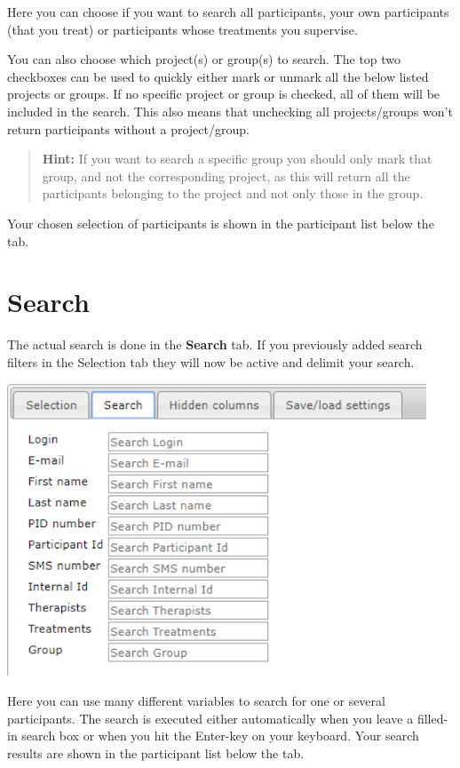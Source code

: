 \documentclass[
]{book}
\begin{document}
Here you can choose if you want to search all participants, your own participants (that you treat) or participants whose treatments you supervise.

You can also choose which project(s) or group(s) to search. The top two checkboxes can be used to quickly either mark or unmark all the below listed projects or groups. If no specific project or group is checked, all of them will be included in the search. This also means that unchecking all projects/groups won't return participants without a project/group.

\begin{quote}
\textbf{Hint:} If you want to search a specific group you should only mark that group, and not the corresponding project, as this will return all the participants belonging to the project and not only those in the group.
\end{quote}

Your chosen selection of participants is shown in the participant list below the tab.

\section{Search}\label{search}

The actual search is done in the \textbf{Search} tab. If you previously added search filters in the Selection tab they will now be active and delimit your search.

\includegraphics{images/search.png}

Here you can use many different variables to search for one or several participants. The search is executed either automatically when you leave a filled-in search box or when you hit the Enter-key on your keyboard. Your search results are shown in the participant list below the tab.
\end{document}
